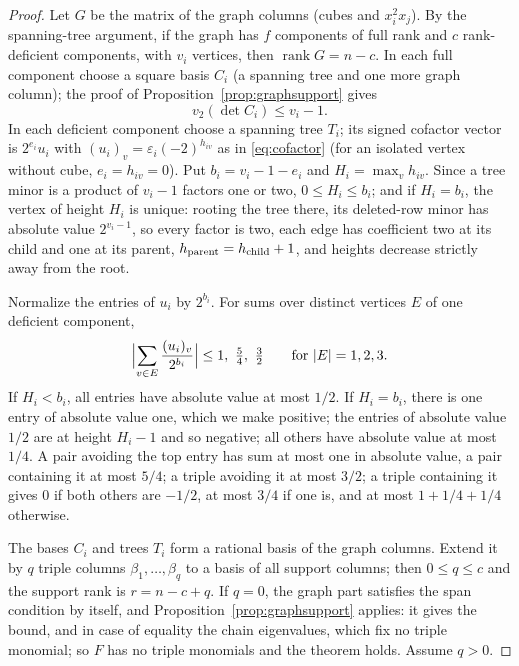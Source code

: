 \documentclass[11pt,a4paper]{article}
\theoremstyle{definition}
\newcommand{\rank}{\operatorname{rank}}
\begin{document}
\begin{proof}
Let $G$ be the matrix of the graph columns (cubes and $x_i^2x_j$). By the
spanning-tree argument, if the graph has $f$ components of full rank and $c$
rank-deficient components, with $v_i$ vertices, then $\rank G=n-c$. In each
full component choose a square basis $C_i$ (a spanning tree and one more graph
column); the proof of Proposition~\ref{prop:graphsupport} gives
\begin{equation}\label{eq:fullcomp}
 v_2(\det C_i)\le v_i-1 .
\end{equation}
In each deficient component choose a spanning tree $T_i$; its signed cofactor
vector is $2^{e_i}u_i$ with $(u_i)_v=\varepsilon_i(-2)^{h_{iv}}$ as in
\eqref{eq:cofactor} (for an isolated vertex without cube, $e_i=h_{iv}=0$).
Put $b_i=v_i-1-e_i$ and $H_i=\max_vh_{iv}$. Since a tree minor is a product of
$v_i-1$ factors one or two, $0\le H_i\le b_i$; and if $H_i=b_i$, the vertex of
height $H_i$ is unique: rooting the tree there, its deleted-row minor has
absolute value $2^{v_i-1}$, so every factor is two, each edge has coefficient
two at its child and one at its parent, $h_{\rm parent}=h_{\rm child}+1$, and
heights decrease strictly away from the root.

Normalize the entries of $u_i$ by $2^{b_i}$. For sums over distinct vertices
$E$ of one deficient component,
\begin{equation}\label{eq:smallsums}
 \Bigl|\sum_{v\in E}\frac{(u_i)_v}{2^{b_i}}\Bigr|\le1,\ \tfrac54,\ \tfrac32
 \qquad\text{for }|E|=1,2,3 .
\end{equation}
If $H_i<b_i$, all entries have absolute value at most $1/2$. If $H_i=b_i$,
there is one entry of absolute value one, which we make positive; the entries
of absolute value $1/2$ are at height $H_i-1$ and so negative; all others have
absolute value at most $1/4$. A pair avoiding the top entry has sum at most one
in absolute value, a pair containing it at most $5/4$; a triple avoiding it at
most $3/2$; a triple containing it gives $0$ if both others are $-1/2$, at
most $3/4$ if one is, and at most $1+1/4+1/4$ otherwise.

The bases $C_i$ and trees $T_i$ form a rational basis of the graph columns.
Extend it by $q$ triple columns $\beta_1,\dots,\beta_q$ to a basis of all
support columns; then $0\le q\le c$ and the support rank is $r=n-c+q$. If
$q=0$, the graph part satisfies the span condition by itself, and
Proposition~\ref{prop:graphsupport} applies: it gives the bound, and in case
of equality the chain eigenvalues, which fix no triple monomial; so $F$ has no
triple monomials and the theorem holds. Assume $q>0$.


\end{proof}
\end{document}

